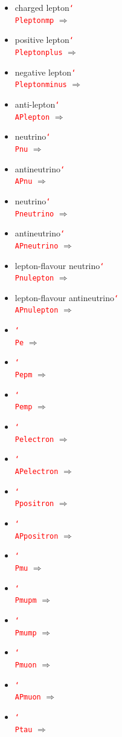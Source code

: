 \documentclass[12pt]{article}
\newcommand{\texcmd}[1]{\textcolor{red}{\texttt{\char`\\#1}}}
\begin{document}
\begin{multicols}{2}
{\begin{itemize}
\item charged lepton\newline \texcmd{Pleptonmp} $\Rightarrow$ \Pleptonmp
\item positive lepton\newline \texcmd{Pleptonplus} $\Rightarrow$ \Pleptonplus
\item negative lepton\newline \texcmd{Pleptonminus} $\Rightarrow$ \Pleptonminus
\item anti-lepton\newline \texcmd{APlepton} $\Rightarrow$ \APlepton
\item neutrino\newline \texcmd{Pnu} $\Rightarrow$ \Pnu
\item antineutrino\newline \texcmd{APnu} $\Rightarrow$ \APnu
\item neutrino\newline \texcmd{Pneutrino} $\Rightarrow$ \Pneutrino
\item antineutrino\newline \texcmd{APneutrino} $\Rightarrow$ \APneutrino
\item lepton-flavour neutrino\newline \texcmd{Pnulepton} $\Rightarrow$ \Pnulepton
\item lepton-flavour antineutrino\newline \texcmd{APnulepton} $\Rightarrow$ \APnulepton
\item  \texcmd{Pe} $\Rightarrow$ \Pe
\item  \texcmd{Pepm} $\Rightarrow$ \Pepm
\item  \texcmd{Pemp} $\Rightarrow$ \Pemp
\item  \texcmd{Pelectron} $\Rightarrow$ \Pelectron
\item  \texcmd{APelectron} $\Rightarrow$ \APelectron
\item  \texcmd{Ppositron} $\Rightarrow$ \Ppositron
\item  \texcmd{APpositron} $\Rightarrow$ \APpositron
\item  \texcmd{Pmu} $\Rightarrow$ \Pmu
\item  \texcmd{Pmupm} $\Rightarrow$ \Pmupm
\item  \texcmd{Pmump} $\Rightarrow$ \Pmump
\item  \texcmd{Pmuon} $\Rightarrow$ \Pmuon
\item  \texcmd{APmuon} $\Rightarrow$ \APmuon
\item  \texcmd{Ptau} $\Rightarrow$ \Ptau

\end{itemize}}
\end{multicols}
\end{document}
